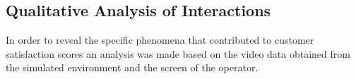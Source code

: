 \documentclass[journal]{IEEEtran}
\begin{document}

\subsection{Qualitative Analysis of Interactions}
\label{subsubsec:qualAnalysis}
In order to reveal the specific phenomena that contributed to customer satisfaction scores an analysis was made based on the video data obtained from the simulated environment and the screen of the operator.
\end{document}

